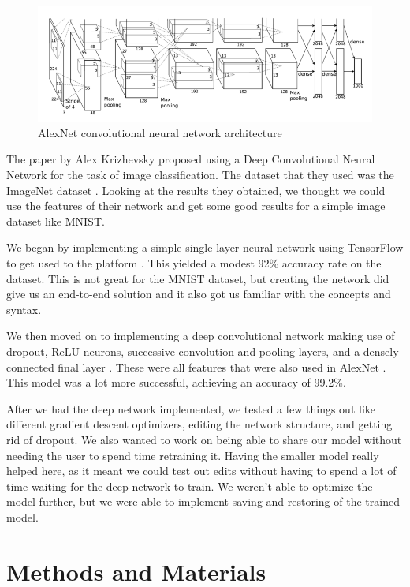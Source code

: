 \documentclass{article}
\begin{document}
\begin{figure}[h]
	\centering
	\includegraphics[width=\textwidth]{alexnet.png}
    \caption{AlexNet convolutional neural network architecture}
    \label{fig:alexnet}
\end{figure}

The paper by Alex Krizhevsky proposed using a Deep Convolutional Neural Network for the task of image classification. The dataset that they used was the ImageNet dataset \cite{alexnet}. Looking at the results they obtained, we thought we could use the features of their network and get some good results for a simple image dataset like MNIST. 

We began by implementing a simple single-layer neural network using TensorFlow to get used to the platform \cite{tutorial}. This yielded a modest 92\% accuracy rate on the dataset. This is not great for the MNIST dataset, but creating the network did give us an end-to-end solution and it also got us familiar with the concepts and syntax.  

We then moved on to implementing a deep convolutional network making use of dropout, ReLU neurons, successive convolution and pooling layers, and a densely connected final layer \cite{tutorial-cnn}. These were all features that were also used in AlexNet \cite{alexnet-features}. This model was a lot more successful, achieving an accuracy of 99.2\%. 

After we had the deep network implemented, we tested a few things out like different gradient descent optimizers, editing the network structure, and getting rid of dropout. We also wanted to work on being able to share our model without needing the user to spend time retraining it. Having the smaller model really helped here, as it meant we could test out edits without having to spend a lot of time waiting for the deep network to train. We weren't able to optimize the model further, but we were able to implement saving and restoring of the trained model.

\section{Methods and Materials}
\end{document}
